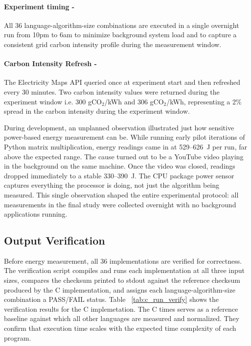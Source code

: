 \paragraph{Experiment timing -} All 36 language-algorithm-size combinations are executed in a single overnight run from 10pm to 6am to minimize background system load and to capture a consistent grid carbon intensity profile during the measurement window. 

\paragraph{Carbon Intensity Refresh -} The Electricity Maps API queried once at experiment start and then refreshed every 30 minutes. Two carbon intensity values were returned during the experiment window i.e. 300 gCO$_2$/kWh and 306 gCO$_2$/kWh, representing a 2\% spread in the carbon intensity during the experiment window. 




\begin{tcolorbox}[colback=gray!8, colframe=gray!40, 
                  title=\textbf{A Note on Background Interference}]
During development, an unplanned observation illustrated just how sensitive power-based energy measurement can be. While running early pilot iterations of Python matrix multiplication, energy  readings came in at 529--626~J per run, far above the expected  range. The cause turned out to be a YouTube video playing in the background on the same machine. Once the video was closed, readings dropped immediately to a stable 330--390~J. The CPU package power sensor captures everything the processor is doing, not just the algorithm being measured. This single observation shaped the entire experimental protocol: all measurements in the 
final study were collected overnight with no background applications running.
\end{tcolorbox}



\subsection{Output Verification}
Before energy measurement, all 36 implementations are verified for correctness. The verification script compiles and runs each implementation at all three input sizes, compares the checksum printed to stdout against the reference checksum produced by the C implementation, and assigns each language-algorithm-size combination a PASS/FAIL status. 
Table ~\ref{tab:c_run_verify} shows the verification results for the C implemetation. The C times serves as a reference baseline against which all other languages are measured and normalized. They confirm that execution time scales with the expected time complexity of each program. 

